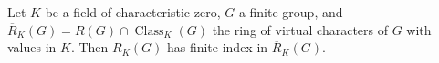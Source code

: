 Let $K$ be a field of characteristic zero, $G$ a finite group, and $\overline{R}_K(G) = R(G) \cap \operatorname{Class}_K(G)$ the ring of virtual characters of $G$ with values in $K$. Then $R_K(G)$ has finite index in $\overline{R}_K(G)$.
